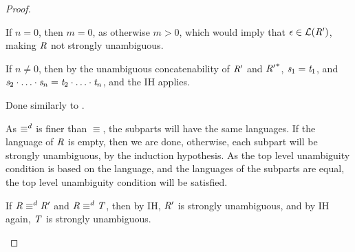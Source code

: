 \documentclass[numbers,10pt,preprint\ifanon ,nocopyrightspace\fi]{sigplanconf}
\begin{document}
\begin{proof}
\begin{case}
    If $n=0$, then $m=0$, as otherwise $m>0$, which would imply that
    $\epsilon\in\mathcal{L}(\mathit{R}')$, making $\mathit{R}$ not strongly
    unambiguous.

    If $n\neq 0$, then by the unambiguous concatenability of $\mathit{R}'$ and
    ${\mathit{R}'}^*$, $\mathit{s}_1 = \mathit{t}_1$, and
    $\mathit{s}_2\cdot\ldots\cdot\mathit{s}_n =
    \mathit{t}_2\cdot\ldots\cdot\mathit{t}_n$, and the IH applies.
  \end{case}

  \begin{case}
    Done similarly to \UnrollstarLeftRule{}.
  \end{case}

  \begin{case}
    As $\equiv^d$ is finer than $\equiv$, the subparts will have
    the same languages.  If the language of $\mathit{R}$ is empty, then we are done,
    otherwise, each subpart will be strongly unambiguous, by the induction
    hypothesis.  As the top
    level unambiguity condition is based on the language, and the languages of
    the subparts are equal, the top level unambiguity condition will be
    satisfied.
  \end{case}

  \begin{case}
    If $\mathit{R} \equiv^d \mathit{R}'$ and $\mathit{R} \equiv^d
    \mathit{T}$, then by IH,
    $\mathit{R}'$ is strongly unambiguous, and by IH again, $\mathit{T}$ is strongly
    unambiguous.
  \end{case}
\end{proof}
\end{document}
